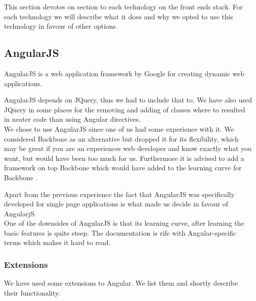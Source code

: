 This section devotes on section to each technology on the front ends stack. For each technology we will describe what it does and why we opted to use this technology in favour of other options.

\subsection{AngularJS}
\label{ssec:1:angularjs}
	AngularJS is a web application framework by Google for creating dynamic web applications. 

	AngularJS depends on JQuery, thus we had to include that to. We have also used JQuery in some places for the removing and adding of classes where to resulted in neater code than using Angular directives.\\

	We chose to use AngularJS since one of us had some experience with it. We considered Backbone as an alternative but dropped it for its flexibility, which may be great if you are an experiences web developer and know exactly what you want, but would have been too much for us. Furthermore it is advised to add a framework on top Backbone which would have added to the learning curve for Backbone \cite{AComparisonofAngularBackboneCanJSandEmber}. 

	Apart from the previous experience the fact that AngularJS was specifically developed for single page applications is what made us decide in favour of AngularjS.\\

	One of the downsides of AngularJS is that its learning curve, after learning the basic features is quite steep. The documentation is rife with Angular-specific terms which makes it hard to read.

	\subsubsection*{Extensions}
	We have used some extensions to Angular. We list them and shortly describe their functionality.

